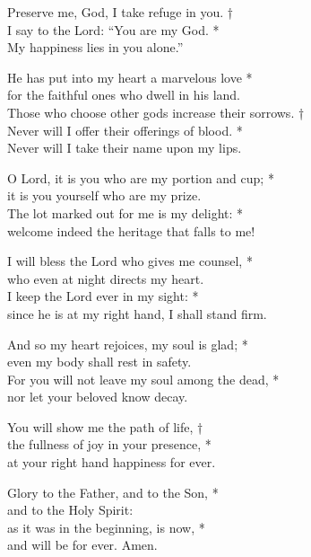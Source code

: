 
Preserve me, God, I take refuge in you. †\\
I say to the Lord: “You are my God. *\\
My happiness lies in you alone.”

He has put into my heart a marvelous love *\\
for the faithful ones who dwell in his land.\\
Those who choose other gods increase their sorrows. †\\
Never will I offer their offerings of blood. *\\
Never will I take their name upon my lips.

O Lord, it is you who are my portion and cup; *\\
it is you yourself who are my prize.\\
The lot marked out for me is my delight: *\\
welcome indeed the heritage that falls to me!

I will bless the Lord who gives me counsel, *\\
who even at night directs my heart.\\
I keep the Lord ever in my sight: *\\
since he is at my right hand, I shall stand firm.

And so my heart rejoices, my soul is glad; *\\
even my body shall rest in safety.\\
For you will not leave my soul among the dead, *\\
nor let your beloved know decay.

You will show me the path of life, †\\
the fullness of joy in your presence, *\\
at your right hand happiness for ever.

Glory to the Father, and to the Son, *\\
and to the Holy Spirit:\\
as it was in the beginning, is now, *\\
and will be for ever. Amen.

